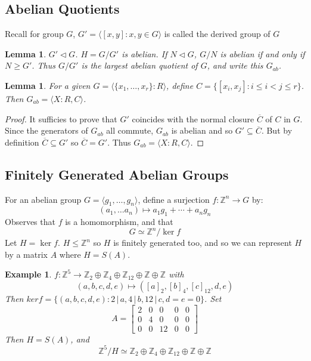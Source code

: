\documentclass[a4paper,10pt]{article}
\newcommand{\ZZ}{\mathbb{Z}}
\newtheorem{eg}[thm]{Example}
\newtheorem{Lem}[thm]{Lemma}
\begin{document}
\subsection{Abelian Quotients}

Recall for group $G$, $G' = \langle [x,y] : x,y \in G \rangle$ is called the derived group of $G$
\begin{Lem}
$G' \triangleleft G$. $H = G / G'$ is abelian. If $N \triangleleft G$, $G / N$ is abelian if and only if $N \geq G'$. Thus $G / G'$ is the largest abelian quotient of $G$, and write this $G_{ab}$.  
\end{Lem}

\begin{Lem}
For a given $G = \langle \{x_1,\dots, x_r\} : R \rangle$, define $C = \{ [ x_i, x_j ] : i \leq i < j \leq r \}$. Then $G_{ab} = \langle X : R, C \rangle$. 
\end{Lem}

\begin{proof}
It sufficies to prove that $G'$ coincides with the normal closure $\overline{C}$ of $C$ in $G$. Since the generators of $G_{ab}$ all commute, $G_{ab}$ is abelian and so $G' \subseteq \overline{C}$. But by definition $\overline{C} \subseteq G'$ so $\overline{C} = G'$. Thus $G_{ab} = \langle X : R,C \rangle$.  
\end{proof}

\subsection{Finitely Generated Abelian Groups}
For an abelian group $G = \langle g_1, \dots, g_n\rangle$, define a surjection $f : \ZZ^n \rightarrow G$ by:
\[ (a_1, \dots a_n) \mapsto a_1 g_1 + \cdots + a_n g_n \]
Observes that $f$ is a homomorphism, and that
\[ G \simeq \ZZ^n / \ker f \]
Let $H = \ker f$. $H \leq \ZZ^n$ so $H$ is finitely generated too, and so we can represent $H$ by a matrix $A$ where $H = S(A)$. 

\begin{eg}
$f: \ZZ^5 \rightarrow \ZZ_2 \oplus \ZZ_4 \oplus \ZZ_{12} \oplus \ZZ \oplus \ZZ$ with 
\[ (a,b,c,d,e) \mapsto ([a]_2, [b]_4, [c]_{12}, d, e) \]
Then $ker f = \{ (a,b,c,d,e): 2 \, | \, a, 4 \, | \, b, 12 \, | \, c, d = e = 0 \}$. Set 
\[ A = \begin{bmatrix}
 2 & 0 & 0 & 0 & 0 \\
 0 & 4 & 0 & 0 & 0 \\
 0 & 0 & 12 & 0 & 0
 \end{bmatrix} \]
Then $H = S(A)$, and
\[ \ZZ^5 / H \simeq \ZZ_2 \oplus \ZZ_4 \oplus \ZZ_{12} \oplus \ZZ \oplus \ZZ \]
\end{eg}
\end{document}
